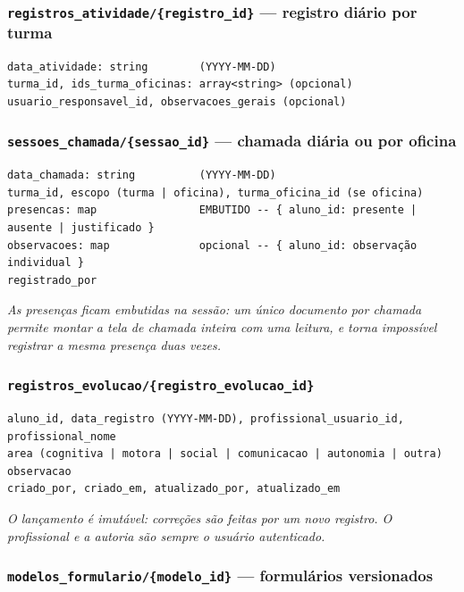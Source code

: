 \documentclass[a4paper,11pt]{article}
\begin{document}
\subsubsection*{\texttt{registros\_atividade/\{registro\_id\}} --- registro diário por turma}

\begin{verbatim}
data_atividade: string        (YYYY-MM-DD)
turma_id, ids_turma_oficinas: array<string> (opcional)
usuario_responsavel_id, observacoes_gerais (opcional)
\end{verbatim}

\subsubsection*{\texttt{sessoes\_chamada/\{sessao\_id\}} --- chamada diária ou por oficina}

\begin{verbatim}
data_chamada: string          (YYYY-MM-DD)
turma_id, escopo (turma | oficina), turma_oficina_id (se oficina)
presencas: map                EMBUTIDO -- { aluno_id: presente | ausente | justificado }
observacoes: map              opcional -- { aluno_id: observação individual }
registrado_por
\end{verbatim}

\textit{As presenças ficam embutidas na sessão: um único documento por chamada permite montar a tela de chamada inteira com uma leitura, e torna impossível registrar a mesma presença duas vezes.}

\subsubsection*{\texttt{registros\_evolucao/\{registro\_evolucao\_id\}}}

\begin{verbatim}
aluno_id, data_registro (YYYY-MM-DD), profissional_usuario_id, profissional_nome
area (cognitiva | motora | social | comunicacao | autonomia | outra)
observacao
criado_por, criado_em, atualizado_por, atualizado_em
\end{verbatim}

\textit{O lançamento é imutável: correções são feitas por um novo registro. O profissional e a autoria são sempre o usuário autenticado.}

\subsubsection*{\texttt{modelos\_formulario/\{modelo\_id\}} --- formulários versionados}
\end{document}
